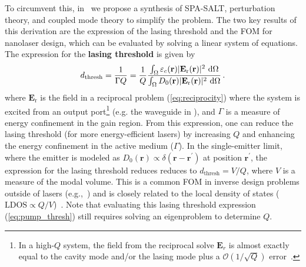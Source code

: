 To circumvent this, in~\cite{ownpub4} we propose a synthesis of SPA-SALT, perturbation theory, and coupled mode theory to simplify the problem. 
The two key results of this derivation are the expression of the lasing threshold and the FOM for nanolaser design, which can be evaluated by solving a linear system of equations.
The expression for the \textbf{lasing threshold} is given by~\cite{ownpub4}
\begin{equation}\label{eq:pump_thresh}
 d_\text{thresh} = \frac{1}{\Gamma Q} = \frac{1}{Q} \frac{\int_{\Omega} \varepsilon_c(\mathbf{r})|\mathbf{E}_{\text{r}}(\mathbf{r})|^2\, \mathop{}\!\text{d} \Omega}{\int_{\Omega} D_0(\mathbf{r}) |\mathbf{E}_{\text{r}}(\mathbf{r})|^2\, \mathop{}\!\text{d} \Omega}\,.
\end{equation}
where $\mathbf{E}_\text{r}$ is the field in a reciprocal problem (\eqref{eq:reciprocity}) where the system is excited from an output port\footnote{In a high-$Q$ system, the field from the reciprocal solve $\mathbf{E}_r$ is almost exactly equal to the cavity mode and/or the lasing mode plus a $\mathcal{O}(1/\sqrt{Q})$ error~\cite{phot_crys}.} (e.g. the waveguide in ), and $\Gamma$ is a measure 
of energy confinement in the gain region. From this expression, one can reduce the lasing threshold (for more energy-efficient lasers) by increasing $Q$ and enhancing the energy confinement in the
active medium ($\Gamma$). In the single-emitter limit, where the emitter is modeled as 
\(D_0(\mathbf{r}) \propto \delta(\mathbf{r} - \mathbf{r}^\prime)\) at position \(\mathbf{r}^\prime\), 
the expression for the lasing threshold reduces  reduces to \(d_{\text{thresh}} = V / Q\), where $V$ is a measure of the modal volume. This is a common FOM in inverse design problems outside of lasers (e.g.,~\cite{LDOS_opt_wang}) and is closely
related to the local density of states ($ \text{LDOS} \propto Q/V$)~\cite{LDOS_opt_wang}.
   Note that evaluating this lasing threshold expression (\eqref{eq:pump_thresh}) still requires solving an eigenproblem to determine \(Q\).



